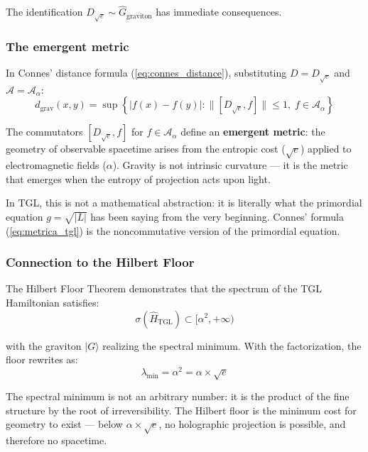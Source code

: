 \documentclass[12pt,a4paper,twoside]{article}
\newcommand{\alphaii}{\alpha^{2}}
\begin{document}
The identification $D_{\sqrt{e}} \sim \hat{G}_{\text{graviton}}$ has immediate consequences.

\subsubsection{The emergent metric}

In Connes' distance formula (\ref{eq:connes_distance}), substituting $D = D_{\sqrt{e}}$ and $\mathcal{A} = \mathcal{A}_\alpha$:
\begin{equation}
d_{\text{grav}}(x,y) = \sup\left\{|f(x) - f(y)| : \|[D_{\sqrt{e}}, f]\| \leq 1,\; f \in \mathcal{A}_\alpha\right\}
\label{eq:metrica_tgl}
\end{equation}

The commutators $[D_{\sqrt{e}}, f]$ for $f \in \mathcal{A}_\alpha$ define an \textbf{emergent metric}: the geometry of observable spacetime arises from the entropic cost ($\sqrt{e}$) applied to electromagnetic fields ($\alpha$). Gravity is not intrinsic curvature --- it is the metric that emerges when the entropy of projection acts upon light.

In TGL, this is not a mathematical abstraction: it is literally what the primordial equation $g = \sqrt{|L|}$ has been saying from the very beginning. Connes' formula (\ref{eq:metrica_tgl}) is the noncommutative version of the primordial equation.

\subsubsection{Connection to the Hilbert Floor}

The Hilbert Floor Theorem \cite{Miguel2026Graviton} demonstrates that the spectrum of the TGL Hamiltonian satisfies:
\begin{equation}
\sigma(\hat{H}_{\text{TGL}}) \subset [\alphaii, +\infty)
\end{equation}

\noindent with the graviton $|G\rangle$ realizing the spectral minimum. With the factorization, the floor rewrites as:
\begin{equation}
\lambda_{\min} = \alphaii = \alpha \times \sqrt{e}
\end{equation}

The spectral minimum is not an arbitrary number: it is the product of the fine structure by the root of irreversibility. The Hilbert floor is the minimum cost for geometry to exist --- below $\alpha \times \sqrt{e}$, no holographic projection is possible, and therefore no spacetime.
\end{document}
